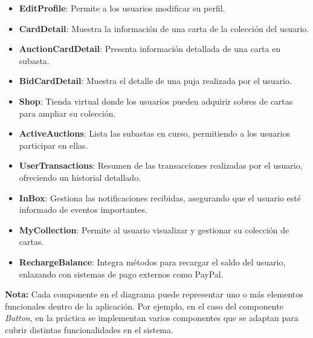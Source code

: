 \begin{itemize}
\begin{itemize}
\begin{itemize}
\begin{itemize}
        \item \textbf{EditProfile}: Permite a los usuarios modificar su perfil.
        \item \textbf{CardDetail}: Muestra la información de una carta de la colección del usuario.
        \item \textbf{AuctionCardDetail}: Presenta información detallada de una carta en subasta.
        \item \textbf{BidCardDetail}: Muestra el detalle de una puja realizada por el usuario.
        \item \textbf{Shop}: Tienda virtual donde los usuarios pueden adquirir sobres de cartas para ampliar su colección.
        \item \textbf{ActiveAuctions}: Lista las subastas en curso, permitiendo a los usuarios participar en ellas.
        \item \textbf{UserTransactions}: Resumen de las transacciones realizadas por el usuario, ofreciendo un historial detallado.
        \item \textbf{InBox}: Gestiona las notificaciones recibidas, asegurando que el usuario esté informado de eventos importantes.
        \item \textbf{MyCollection}: Permite al usuario visualizar y gestionar su colección de cartas.
        \item \textbf{RechargeBalance}: Integra métodos para recargar el saldo del usuario, enlazando con sistemas de pago externos como PayPal.
    \end{itemize}
\end{itemize}

    \end{itemize}
\end{itemize}

\bigskip
\textbf{Nota:} Cada componente en el diagrama puede representar uno o más elementos funcionales dentro de la aplicación. 
Por ejemplo, en el caso del componente \textit{Button}, en la práctica se implementan varios componentes que se adaptan para cubrir distintas funcionalidades en el sistema.


